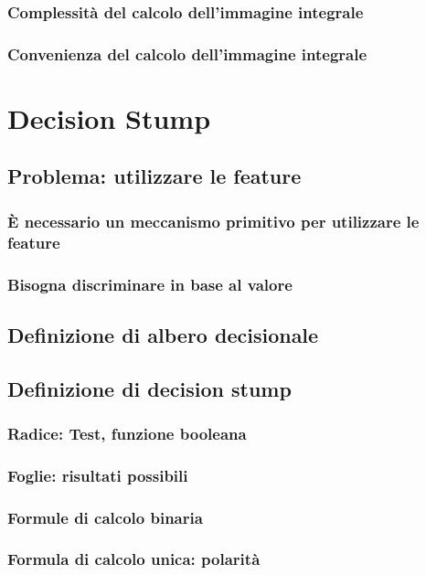             \subsubsection{Complessità del calcolo dell'immagine integrale}
            \subsubsection{Convenienza del calcolo dell'immagine integrale}
    \section{Decision Stump}
    \label{sec:decision_stump}
        \subsection{Problema: utilizzare le feature}
            \subsubsection{È necessario un meccanismo primitivo per utilizzare le feature}
            \subsubsection{Bisogna discriminare in base al valore}
        \subsection{Definizione di albero decisionale}
        \subsection{Definizione di decision stump}
            \subsubsection{Radice: Test, funzione booleana}
            \subsubsection{Foglie: risultati possibili}
            \subsubsection{Formule di calcolo binaria}
            \subsubsection{Formula di calcolo unica: polarità}

